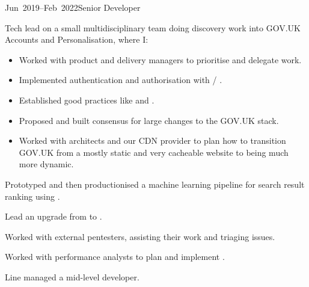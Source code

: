 \documentclass[a4paper]{barrucadu-cv}
\newcommand{\range}[2]{#1–#2}
\begin{document}
\begin{cventry}{\range{Jun~2019}{Feb~2022}}{Senior Developer}
  \begin{tightitemize}
  \item Tech lead on a small multidisciplinary  team
    doing discovery work into GOV.UK Accounts and Personalisation, where I:

    \begin{itemize}
    \item Worked with product and delivery managers to prioritise and delegate work.
    \item Implemented authentication and authorisation with  / .
    \item Established good practices like  and .
    \item Proposed and built consensus for large changes to the GOV.UK stack.
    \item Worked with architects and our CDN provider to plan how to transition GOV.UK from a mostly static and very cacheable website to being much more dynamic.
    \end{itemize}

  \item Prototyped and then productionised a machine learning pipeline
    for search result ranking using .

  \item Lead an upgrade from  to
    .

  \item Worked with external pentesters, assisting their work and
    triaging issues.

  \item Worked with performance analysts to plan and implement
    .

  \item Line managed a mid-level developer.
  \end{tightitemize}
\end{cventry}
\end{document}
